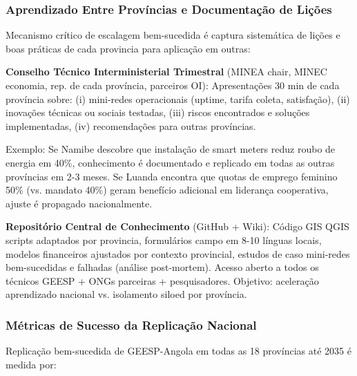\documentclass[12pt, a4paper]{article}
\begin{document}
\subsubsection{Aprendizado Entre Províncias e Documentação de Lições}

Mecanismo crítico de escalagem bem-sucedida é captura sistemática de lições e boas práticas de cada provincia para aplicação em outras:

\textbf{Conselho Técnico Interministerial Trimestral} (MINEA chair, MINEC economia, rep. de cada província, parceiros OI): Apresentações 30 min de cada província sobre: (i) mini-redes operacionais (uptime, tarifa coleta, satisfação), (ii) inovações técnicas ou sociais testadas, (iii) riscos encontrados e soluções implementadas, (iv) recomendações para outras províncias.

Exemplo: Se Namibe descobre que instalação de smart meters reduz roubo de energia em 40\%, conhecimento é documentado e replicado em todas as outras províncias em 2-3 meses. Se Luanda encontra que quotas de emprego feminino 50\% (vs. mandato 40\%) geram benefício adicional em liderança cooperativa, ajuste é propagado nacionalmente.

\textbf{Repositório Central de Conhecimento} (GitHub + Wiki): Código GIS QGIS scripts adaptados por provincia, formulários campo em 8-10 línguas locais, modelos financeiros ajustados por contexto provincial, estudos de caso mini-redes bem-sucedidas e falhadas (análise post-mortem). Acesso aberto a todos os técnicos GEESP + ONGs parceiras + pesquisadores. Objetivo: aceleração aprendizado nacional vs. isolamento siloed por província.

\subsubsection{Métricas de Sucesso da Replicação Nacional}

Replicação bem-sucedida de GEESP-Angola em todas as 18 províncias até 2035 é medida por:
\end{document}
